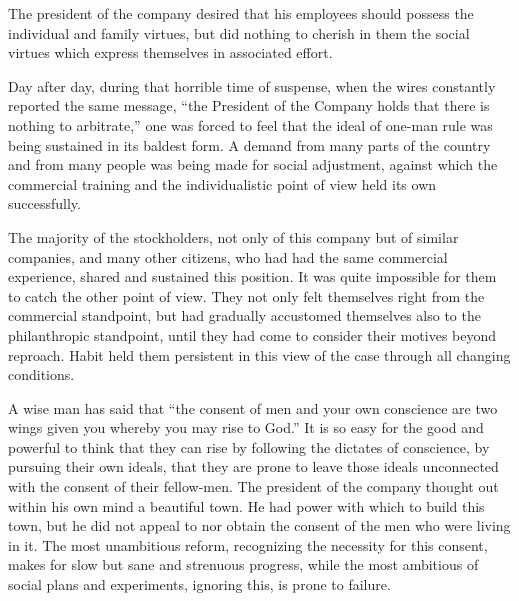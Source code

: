 \documentclass[]{article}
\begin{document}
\begin{sectionbody}
\addamsparagraph The president of the company desired that his employees should possess
the individual and family virtues, but did nothing to cherish in them
the social virtues which express themselves in associated effort.

\addamsparagraph Day after day, during that horrible time of suspense, when the wires
constantly reported the same message, ``the President of the Company
holds that there is nothing to arbitrate,'' one was forced to feel that
the ideal of one-man rule was being sustained in its baldest form. A
demand from many parts of the country and from many people was being
made for social adjustment, against which the commercial training and
the individualistic point of view held its own successfully.

\addamsparagraph The majority of the stockholders, not only of this company but of
similar companies, and many other citizens, who had had the same
commercial experience, shared and sustained this position. It was quite
impossible for them to catch the other point of view. They not only felt
themselves right from the commercial standpoint, but had gradually
accustomed themselves also to the philanthropic standpoint, until they
had come to consider their motives beyond reproach. Habit held them
persistent in this view of the case through all changing conditions.

\addamsparagraph A wise man has said that ``the consent of men and your own conscience
are two wings given you whereby you may rise to God.'' It is so easy for
the good and powerful to think that they can rise by following the
dictates of conscience, by pursuing their own ideals, that they are
prone to leave those ideals unconnected with the consent of their
fellow-men. The president of the company thought out within his own mind
a beautiful town. He had power with which to build this town, but he did
not appeal to nor obtain the consent of the men who were living in it.
The most unambitious reform, recognizing the necessity for this consent,
makes for slow but sane and strenuous progress, while the most ambitious
of social plans and experiments, ignoring this, is prone to failure.


\end{sectionbody}
\end{document}
